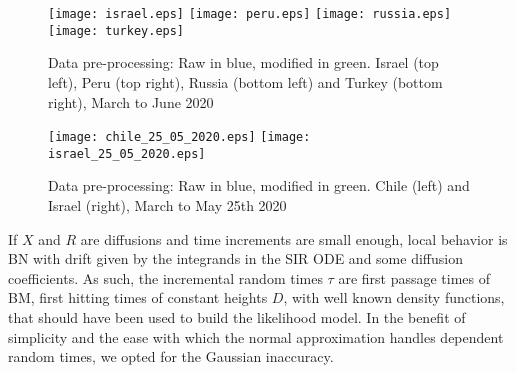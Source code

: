 \documentclass{article}
\begin{document}
\begin{figure}[H]
    \begin{center}
        {\texttt{[image: israel.eps]}}
        \qquad
        {\texttt{[image: peru.eps]}}
        \qquad
    {\texttt{[image: russia.eps]}}
    \qquad
    {\texttt{[image: turkey.eps]}}
    \end{center}
    \begin{center}
    \caption{Data pre-processing: Raw in blue, modified in green. Israel (top left), Peru (top right), Russia (bottom left) and Turkey (bottom right), March to June 2020
    }
\label{fig:israel_peru_russia_turkey_07_06_2020}
    \end{center}
\end{figure}


\begin{figure}[H]
    \begin{center}
        {\texttt{[image: chile\_25\_05\_2020.eps]}}
        \qquad
        {\texttt{[image: israel\_25\_05\_2020.eps]}}
    \end{center}
    \begin{center}
    \caption{Data pre-processing: Raw in blue, modified in green. Chile (left) and Israel (right), March to May 25th 2020
    }
\label{fig:chile_and_israel_25_05_2020}
    \end{center}
\end{figure}

\newpage


\bigskip

\noindent If $X$ and $R$ are diffusions and time increments are small enough, local behavior is BN with drift given by the integrands in the SIR ODE and some diffusion coefficients. As such, the incremental random times $\tau$ are first passage times of BM, first hitting times of constant heights $D$, with well known density functions, that should have been used to build the likelihood model. In the benefit of simplicity and the ease with which the normal approximation handles dependent random times, we opted for the Gaussian inaccuracy.

\bigskip
\end{document}
